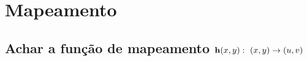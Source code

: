 
\chapter{Mapeamento}

\section{ Achar a função de mapeamento $\VECTOR{h}(x,y):~(x,y) \rightarrow (u,v)$ }



